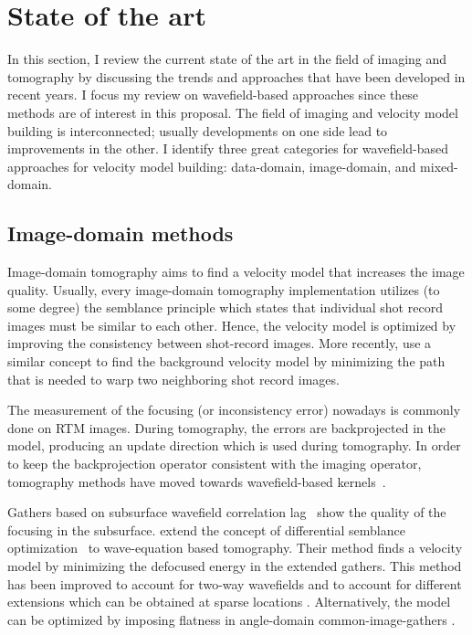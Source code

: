 \section{State of the art}
In this section, I review the current state of the art in the field of imaging and tomography 
by discussing the trends and approaches that have been developed in recent years. I focus my 
review on wavefield-based approaches since these methods are of interest in this proposal. The field of 
imaging and velocity model building is interconnected; usually developments on one side lead to 
improvements in the other.
I identify three great categories for wavefield-based approaches
 for velocity model building: data-domain, image-domain, and mixed-domain. 


\subsection{Image-domain methods}
 Image-domain tomography aims to find a velocity model that increases the image quality. Usually, 
every image-domain tomography implementation utilizes (to some degree)
the semblance principle \citep{Alyahya1989VAiterativeProfileMig} which  
 states that individual shot record images must be similar to each other. 
Hence, the velocity model is optimized by improving the consistency between shot-record 
images. More recently, 
  \cite{perrone2015waveform} use a similar concept to find the background velocity 
model by minimizing the path that is needed to warp two neighboring shot record images. 
 

The measurement of the focusing (or inconsistency error) nowadays is commonly done on RTM
images. During tomography, the errors are backprojected in the model, producing an update
direction which is used during tomography. 
In order to keep the backprojection operator consistent with the imaging operator, 
tomography methods have moved  towards  wavefield-based kernels~\citep{Woodward_1992,SavaBiondi.gp.wemva1,SavaBiondi.gp.wemva2,
Xie2008FiniteFreqSensitityKernel}. 

Gathers based on subsurface wavefield correlation lag~\citep{rickett:883,sava:S209,GPR:GPR888}
show the quality of the focusing in the subsurface. \cite{ShenSymes.geo.2008} extend
the concept of differential semblance optimization~\citep{symes.carazzone} to wave-equation
based tomography. Their method finds a velocity model by minimizing the defocused energy in
 the extended gathers. This method has been improved to account for two-way wavefields
\citep{Wiktor,tony_seg:cwp12,Shan:chevron,BiondiAli:2014,diaz2015} and to account 
for different extensions which can be obtained at sparse locations \citep{tony:gp15}. Alternatively,
 the model can be optimized by imposing flatness in angle-domain common-image-gathers
\citep{ursin,biondiAngle,Liu2010,Montel,yiShen}. 


